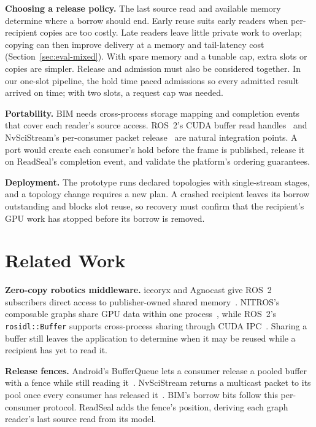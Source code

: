 \documentclass[conference]{IEEEtran}
\newcommand{\code}[1]{\texttt{#1}}
\begin{document}
\textbf{Choosing a release policy.} The last source read and available memory determine where a borrow should end. Early reuse suits early readers when per-recipient copies are too costly. Late readers leave little private work to overlap; copying can then improve delivery at a memory and tail-latency cost (Section~\ref{sec:eval-mixed}). With spare memory and a tunable cap, extra slots or copies are simpler. Release and admission must also be considered together. In our one-slot pipeline, the hold time paced admissions so every admitted result arrived on time; with two slots, a request cap was needed.

\textbf{Portability.} BIM needs cross-process storage mapping and completion events that cover each reader's source access. ROS~2's CUDA buffer read handles~\cite{cudabackend} and NvSciStream's per-consumer packet release~\cite{nvscistream} are natural integration points. A port would create each consumer's hold before the frame is published, release it on ReadSeal's completion event, and validate the platform's ordering guarantees.

\textbf{Deployment.} The prototype runs declared topologies with single-stream stages, and a topology change requires a new plan. A crashed recipient leaves its borrow outstanding and blocks slot reuse, so recovery must confirm that the recipient's GPU work has stopped before its borrow is removed.

\section{Related Work}
\label{sec:related}

\textbf{Zero-copy robotics middleware.} iceoryx and Agnocast give ROS~2 subscribers direct access to publisher-owned shared memory~\cite{iceoryx,agnocast}. NITROS's composable graphs share GPU data within one process~\cite{nitros}, while ROS~2's \code{rosidl::Buffer} supports cross-process sharing through CUDA IPC~\cite{rosidlbuffer}. Sharing a buffer still leaves the application to determine when it may be reused while a recipient has yet to read it.

\textbf{Release fences.} Android's BufferQueue lets a consumer release a pooled buffer with a fence while still reading it~\cite{bufferqueue}. NvSciStream returns a multicast packet to its pool once every consumer has released it~\cite{nvscistream}. BIM's borrow bits follow this per-consumer protocol. ReadSeal adds the fence's position, deriving each graph reader's last source read from its model.
\end{document}

